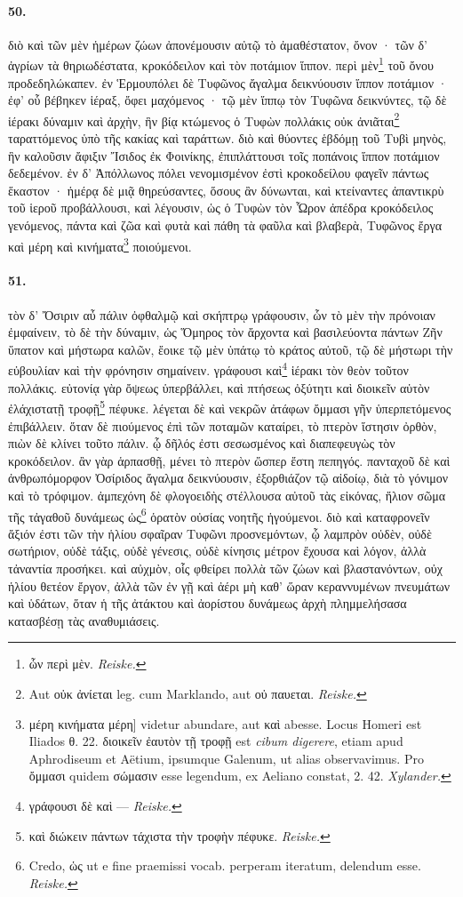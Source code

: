 \documentclass[a4paper, 11pt, oneside, polutonikogreek, german, landscape]{article}
\begin{document}
\paragraph{50.}
διὸ καὶ τῶν μὲν ἡμέρων ζώων ἀπονέμουσιν αὐτῷ τὸ ἀμαθέστατον, ὄνον · τῶν δ' ἀγρίων τὰ θηριωδέστατα, κροκόδειλον καὶ τὸν ποτάμιον ἵππον. περὶ μὲν\footnote{ὧν περὶ μὲν. \emph{Reiske.}} τοῦ ὄνου προδεδηλώκαπεν. ἐν Ἑρμουπόλει δὲ Τυφῶνος ἄγαλμα δεικνύουσιν ἵππον ποτάμιον · ἐφ' οὗ βέβηκεν ἱέραξ, ὄφει μαχόμενος · τῷ μὲν ἵππῳ τὸν Τυφῶνα δεικνύντες, τῷ δὲ ἱέρακι δύναμιν καὶ ἀρχὴν, ἣν βίᾳ κτώμενος ὁ Τυφὼν πολλάκις οὐκ ἀνιᾶται\footnote{Aut οὐκ ἀνίεται leg. cum Marklando, aut οὐ παυεται. \emph{Reiske.}} ταραττόμενος ὑπὸ τῆς κακίας καὶ ταράττων. διὸ καὶ θύοντες ἑβδόμῃ τοῦ Τυβὶ μηνὸς, ἣν καλοῦσιν ἄφιξιν Ἴσιδος ἐκ Φοινίκης, ἐπιπλάττουσι τοῖς ποπάνοις ἵππον ποτάμιον δεδεμένον. ἐν δ' Ἀπόλλωνος πόλει νενομισμένον ἐστὶ κροκοδείλου φαγεῖν πάντως ἕκαστον · ἡμέρᾳ δὲ μιᾷ θηρεύσαντες, ὅσους ἂν δύνωνται, καὶ κτείναντες ἀπαντικρὺ τοῦ ἱεροῦ προβάλλουσι, καὶ λέγουσιν, ὡς ὁ Τυφὼν τὸν Ὧρον ἀπέδρα κροκόδειλος γενόμενος, πάντα καὶ ζῶα καὶ φυτὰ καὶ πάθη τὰ φαῦλα καὶ βλαβερὰ, Τυφῶνος ἔργα καὶ μέρη καὶ κινήματα\footnote{μέρη κινήματα μέρη] videtur abundare, aut καὶ abesse. Locus Homeri est Iliados θ. 22. διοικεῖν ἐαυτὸν τῇ τροφῇ est \emph{cibum digerere}, etiam apud Aphrodiseum et Aëtium, ipsumque Galenum, ut alias observavimus. Pro ὄμμασι quidem σώμασιν esse legendum, ex Aeliano constat, 2. 42. \emph{Xylander.}} ποιούμενοι.

\paragraph{51.}
τὸν δ' Ὄσιριν αὖ πάλιν ὀφθαλμῷ καὶ σκήπτρῳ γράφουσιν, ὧν τὸ μὲν τὴν πρόνοιαν ἐμφαίνειν, τὸ δὲ τὴν δύναμιν, ὡς Ὅμηρος τὸν ἄρχοντα καὶ βασιλεύοντα πάντων Ζῆν ὕπατον καὶ μήστωρα καλῶν, ἔοικε τῷ μὲν ὑπάτῳ τὸ κράτος αὐτοῦ, τῷ δὲ μήστωρι τὴν εὐβουλίαν καὶ τὴν φρόνησιν σημαίνειν. γράφουσι καὶ\footnote{γράφουσι δὲ καὶ --- \emph{Reiske.}} ἱέρακι τὸν θεὸν τοῦτον πολλάκις. εὐτονίᾳ γὰρ ὄψεως ὑπερβάλλει, καὶ πτήσεως ὀξύτητι καὶ διοικεῖν αὑτὸν ἐλάχιστατῇ τροφῇ\footnote{καὶ διώκειν πάντων τάχιστα τὴν τροφὴν πέφυκε. \emph{Reiske.}} πέφυκε. λέγεται δὲ καὶ νεκρῶν ἀτάφων ὄμμασι γῆν ὑπερπετόμενος ἐπιβάλλειν. ὅταν δὲ πιούμενος ἐπὶ τῶν ποταμῶν καταίρει, τὸ πτερὸν ἵστησιν ὀρθὸν, πιὼν δὲ κλίνει τοῦτο πάλιν. ᾧ δῆλός ἐστι σεσωσμένος καὶ διαπεφευγὼς τὸν κροκόδειλον. ἂν γὰρ ἁρπασθῇ, μένει τὸ πτερὸν ὥσπερ ἔστη πεπηγός. πανταχοῦ δὲ καὶ ἀνθρωπόμορφον Ὀσίριδος ἄγαλμα δεικνύουσιν, ἐξορθιάζον τῷ αἰδοίῳ, διὰ τὸ γόνιμον καὶ τὸ τρόφιμον. ἀμπεχόνη δὲ φλογοειδὴς στέλλουσα αὐτοῦ τὰς εἰκόνας, ἥλιον σῶμα τῆς τἀγαθοῦ δυνάμεως ὡς\footnote{Credo, ὡς ut e fine praemissi vocab. perperam iteratum, delendum esse. \emph{Reiske.}} ὁρατὸν οὐσίας νοητῆς ἡγούμενοι. διὸ καὶ καταφρονεῖν ἄξιόν ἐστι τῶν τὴν ἡλίου σφαῖραν Τυφῶνι προσνεμόντων, ᾧ λαμπρὸν οὐδὲν, οὐδὲ σωτήριον, οὐδὲ τάξις, οὐδὲ γένεσις, οὐδὲ κίνησις μέτρον ἔχουσα καὶ λόγον, ἀλλὰ τἀναντία προσήκει. καὶ αὐχμὸν, οἷς φθείρει πολλὰ τῶν ζώων καὶ βλαστανόντων, οὐχ ἡλίου θετέον ἔργον, ἀλλὰ τῶν ἐν γῇ καὶ ἀέρι μὴ καθ' ὥραν κεραννυμένων πνευμάτων καὶ ὑδάτων, ὅταν ἡ τῆς ἀτάκτου καὶ ἀορίστου δυνάμεως ἀρχὴ πλημμελήσασα κατασβέσῃ τὰς αναθυμιάσεις.
\end{document}
